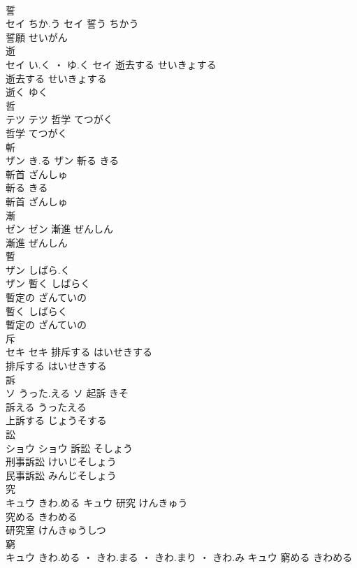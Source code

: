 \documentclass[8pt]{extreport}
\begin{document}
\begin{CJK}{UTF8}{min}
\\	誓	
\\	セイ	ちか.う	セイ	誓う	ちかう	
\\	誓願	せいがん	
\\	逝	
\\	セイ	い.く ・ ゆ.く	セイ	逝去する	せいきょする	
\\	逝去する	せいきょする	
\\	逝く	ゆく	
\\	哲	
\\	テツ		テツ	哲学	てつがく	
\\	哲学	てつがく	
\\	斬	
\\	ザン	き.る	ザン	斬る	きる	
\\	斬首	ざんしゅ	
\\	斬る	きる	
\\	斬首	ざんしゅ	
\\	漸	
\\	ゼン		ゼン	漸進	ぜんしん	
\\	漸進	ぜんしん	
\\	暫	
\\	ザン	しばら.く
\\	ザン	暫く	しばらく	
\\	暫定の	ざんていの	
\\	暫く	しばらく	
\\	暫定の	ざんていの	
\\	斥	
\\	セキ		セキ	排斥する	はいせきする	
\\	排斥する	はいせきする	
\\	訴	
\\	ソ	うった.える	ソ	起訴	きそ	
\\	訴える	うったえる	
\\	上訴する	じょうそする	
\\	訟	
\\	ショウ		ショウ	訴訟	そしょう	
\\	刑事訴訟	けいじそしょう	
\\	民事訴訟	みんじそしょう	
\\	究	
\\	キュウ	きわ.める	キュウ	研究	けんきゅう	
\\	究める	きわめる	
\\	研究室	けんきゅうしつ	
\\	窮	
\\	キュウ	きわ.める ・ きわ.まる ・ きわ.まり ・ きわ.み	キュウ	窮める	きわめる	

\end{CJK}
\end{document}
